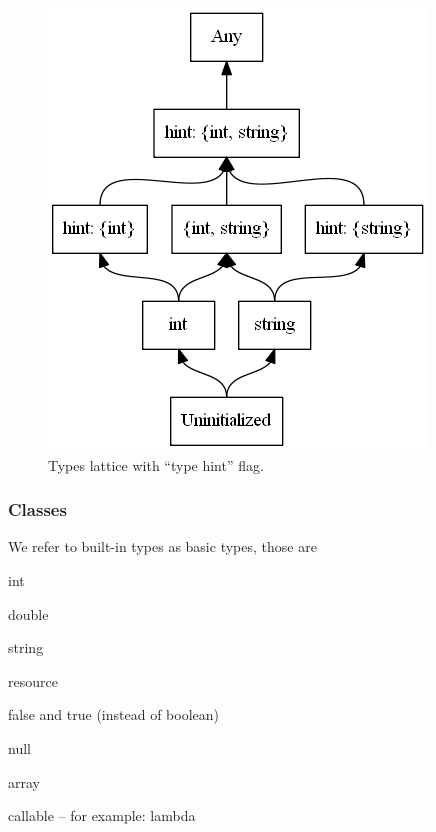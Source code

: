         \begin{figure}[h]  
          \centering        
          \includegraphics[scale=0.6]{graphs/hints-lattice.png}
          \caption{Types lattice with ``type hint'' flag.\label{hintslattice}}    
        \end{figure}
        
        
        \subsubsection*{Classes}
        
        We refer to built-in types as basic types, those are 
        \begin{multicols}{2}
        \begin{itemize*}
            \item int
            \item double
            \item string
            \item resource
            \item false and true (instead of boolean)
            \item null
            \item array
            \item callable -- for example: lambda
        \end{itemize*}
        \end{multicols}
        
